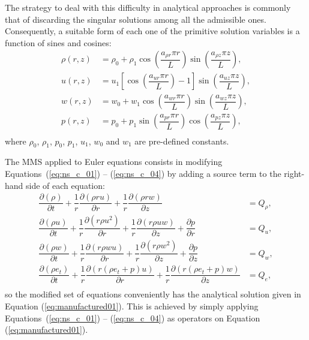 \documentclass[a4paper,10pt]{article}
\newcommand{\Diff}[2] {\dfrac{\partial( #1)}{\partial #2}}
\newcommand{\diff}[2] {\dfrac{\partial #1}{\partial #2}}
\begin{document}
\begin{landscape}
The strategy to deal with this difficulty in analytical approaches is commonly that of discarding the singular solutions among all the admissible ones. %
Consequently, a suitable form of each one of the primitive solution variables is a function of sines and cosines:
\begin{equation}
 \label{eq:manufactured01}
\begin{split}
\rho(r,z)&= \rho_0 + \rho_1 \cos\left(\dfrac{a_{\rho r} \pi r}{L}\right) \sin\left(\dfrac{a_{\rho z} \pi z}{L}\right) ,\\
u(r,z)&=u_1 \left[\cos\left(\dfrac{a_{ur} \pi r}{L}\right)-1\right] \sin\left(\dfrac{a_{uz} \pi z}{L}\right) ,\\
w(r,z)&=w_0 + w_1 \cos\left(\dfrac{a_{wr} \pi r}{L}\right) \sin\left(\dfrac{a_{wz} \pi z}{L}\right) ,\\
p(r,z)&=p_0 + p_1 \sin\left(\dfrac{a_{pr} \pi r}{L}\right) \cos\left(\dfrac{a_{pz} \pi z}{L}\right), \\
\end{split}
\end{equation}
%
where $\rho_0$, $\rho_1$, $p_0$, $p_1$, $u_1$, $w_0$ and $w_1$ are pre-defined constants.

The MMS applied to Euler equations consists in modifying Equations~(\ref{eq:ns_c_01}) -- (\ref{eq:ns_c_04}) by adding a source term to the right-hand side of each equation:
\begin{equation}
 \label{eq:ns2d_mod}
\begin{split}
 \Diff{\rho}{t}+ \dfrac{1}{r} \Diff{\rho r u}{r}+ \dfrac{1}{r}\Diff{\rho r w}{z}&=Q_\rho, \\
\Diff{\rho u}{t} +\dfrac{1}{r}\Diff{r \rho u^2 }{r}+ \dfrac{1}{r}\Diff{r \rho u w}{z}+\diff{p}{r} &=Q_u,\\
\Diff{\rho w}{t} + \dfrac{1}{r}\Diff{r \rho w u }{r}+ \dfrac{1}{r}\Diff{r \rho w^2 }{z}+\diff{p}{z} &=Q_w,\\
\Diff{\rho e_t}{ t}+\dfrac{1}{r}\Diff{r(\rho e_t+p) u}{ r}+\dfrac{1}{r}\Diff{r(\rho e_t+p)w}{z} &=Q_{e},\\
\end{split}
\end{equation}
so the modified set of equations conveniently has the analytical solution given in Equation (\ref{eq:manufactured01}). This is achieved by simply applying Equations~(\ref{eq:ns_c_01}) -- (\ref{eq:ns_c_04}) as operators on Equation (\ref{eq:manufactured01}).


\end{landscape}
\end{document}
